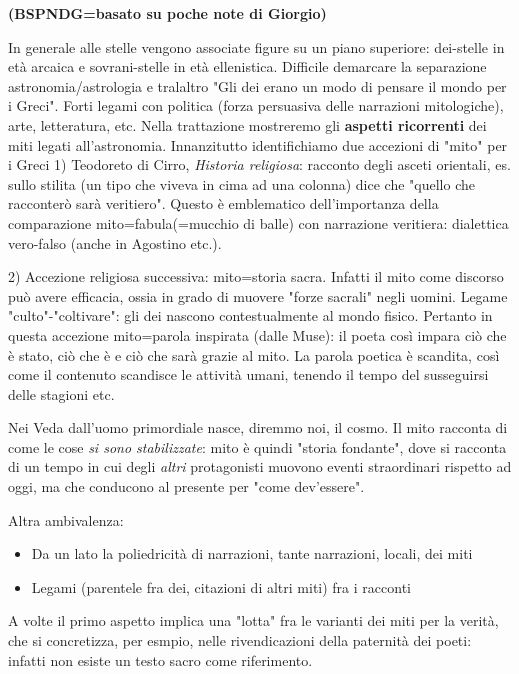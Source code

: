 \documentclass[main.tex]{subfiles}
\begin{document}

\textbf{(BSPNDG=basato su poche note di Giorgio)}

In generale alle stelle vengono associate figure su un piano superiore: dei-stelle in età arcaica e sovrani-stelle in età ellenistica.
Difficile demarcare la separazione astronomia/astrologia e tralaltro "Gli dei erano un modo di pensare il mondo per i Greci". Forti legami con politica (forza persuasiva delle narrazioni mitologiche), arte, letteratura, etc.
Nella trattazione mostreremo gli \textbf{aspetti ricorrenti} dei miti legati all'astronomia.
Innanzitutto identifichiamo due accezioni di "mito" per i Greci
1) Teodoreto di Cirro, \textit{Historia religiosa}: racconto degli asceti orientali, es. sullo stilita (un tipo che viveva in cima ad una colonna) dice che "quello che racconterò sarà veritiero". Questo è emblematico dell'importanza della comparazione mito=fabula(=mucchio di balle) con narrazione veritiera: dialettica vero-falso (anche in Agostino etc.).

2) Accezione religiosa successiva: mito=storia sacra. Infatti il mito come discorso può avere efficacia, ossia in grado di muovere "forze sacrali" negli uomini. Legame "culto"-"coltivare": gli dei nascono contestualmente al mondo fisico. Pertanto in questa accezione mito=parola inspirata (dalle Muse): il poeta così impara ciò che è stato, ciò che è e ciò che sarà grazie al mito. La parola poetica è scandita, così come il contenuto scandisce le attività umani, tenendo il tempo del susseguirsi delle stagioni etc.

Nei Veda dall'uomo primordiale nasce, diremmo noi, il cosmo. Il mito racconta di come le cose \textit{si sono stabilizzate}: mito è quindi "storia fondante", dove si racconta di un tempo in cui degli \textit{altri} protagonisti muovono eventi straordinari rispetto ad oggi, ma che conducono al presente per "come dev'essere".

Altra ambivalenza:
\begin{itemize}
    \item Da un lato la poliedricità di narrazioni, tante narrazioni, locali, dei miti
    \item Legami (parentele fra dei, citazioni di altri miti) fra i racconti
\end{itemize}
A volte il primo aspetto implica una "lotta" fra le varianti dei miti per la verità, che si concretizza, per esmpio, nelle rivendicazioni della paternità dei poeti: infatti non esiste un testo sacro come riferimento.
\end{document}
